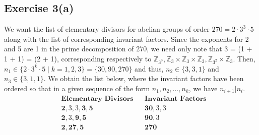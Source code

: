 \subsection*{Exercise 3(a)}
We want the list of elementary divisors for abelian groups of order $270=2\cdot3^3\cdot5$ along with the list of corresponding invariant factors. Since the exponents for 2 and 5 are 1 in the prime decomposition of 270, we need only note that 3 = (1 + 1 + 1) = (2 + 1), corresponding respectively to $\mathbb{Z}_{3^3}, \mathbb{Z}_3\times\mathbb{Z}_3\times\mathbb{Z}_3, \mathbb{Z}_{3^2}\times\mathbb{Z}_3$. Then, $n_1 \in \{2\cdot3^k\cdot5 \mid k = 1,2,3\} = \{30,90,270\}$ and thus, $n_2 \in \{3,3,1\}$ and $n_3 \in \{3,1,1\}$. We obtain the list below, where the invariant factors have been ordered so that in a given sequence of the form $n_1, n_2,..., n_k$, we have $n_{i+1} | n_{i}$. 
\begin{align*}
 &\textbf{Elementary Divisors} && \textbf{Invariant Factors} \\
    &\textbf{2}, 3, 3, \textbf{3}, \textbf{5} && \textbf{30},3, 3 \\
    &\textbf{2}, 3,\textbf{9}, \textbf{5} && \textbf{90}, 3 \\
    &\textbf{2}, \textbf{27}, \textbf{5} && \textbf{270}
\end{align*}
